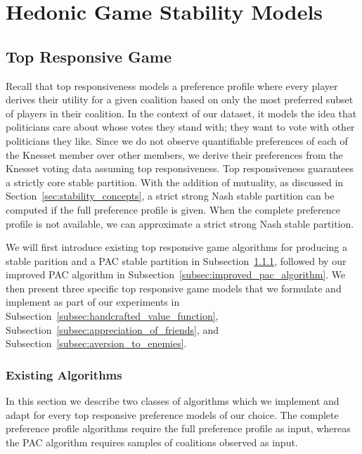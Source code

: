 
\chapter{Hedonic Game Stability Models}
\label{ch:hedonic}
\vspace{2em}

\section{Top Responsive Game}
\label{sec:top_responsive_game}
Recall that top responsiveness models a preference profile where every player
derives their utility for a given coalition based on only the most preferred
subset of players in their coalition.
In the context of our dataset, it models the idea that politicians care about
whose votes they stand with; they want to vote with other politicians they like.
Since we do not observe quantifiable preferences of each of the Knesset member
over other members, we derive their preferences from the Knesset voting data
assuming top responsiveness.
Top responsiveness guarantees a strictly core stable partition.
With the addition of mutuality, as discussed in Section~\ref{sec:stability_concepts},
a strict strong Nash stable partition can be computed if the full preference
profile is given.
When the complete preference profile is not available, we can approximate
a strict strong Nash stable partition.

We will first introduce existing top responsive game algorithms for producing a
stable parition and a PAC stable partition in Subsection~\ref{subsec:algorithms},
followed by our improved PAC algorithm in
Subsection~\ref{subsec:improved_pac_algorithm}.
We then present three specific top responsive game models that we formulate
and implement as part of our experiments in
Subsection~\ref{subsec:handcrafted_value_function},
Subsection~\ref{subsec:appreciation_of_friends},
and Subsection~\ref{subsec:aversion_to_enemies}.

\subsection{Existing Algorithms}
\label{subsec:algorithms}
In this section we describe two classes of algorithms which we implement and adapt
for every top responsive preference models of our choice.
The complete preference profile algorithms require the full preference profile as
input, whereas the PAC algorithm requires samples of coalitions observed as input.

